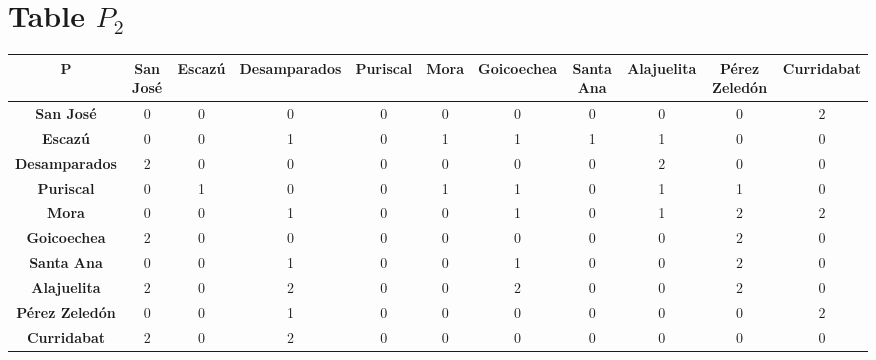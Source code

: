 \documentclass{article}
\begin{document}
\section{Table $P_{2}$}
\begin{center}
    \begin{tabular}{|c||c|c|c|c|c|c|c|c|c|c|}
        \hline
        \textbf{P} & \textbf{San José} & \textbf{Escazú} & \textbf{Desamparados} & \textbf{Puriscal} & \textbf{Mora} & \textbf{Goicoechea} & \textbf{Santa Ana} & \textbf{Alajuelita} & \textbf{Pérez Zeledón} & \textbf{Curridabat} \\
        \hline
        \hline
        \textbf{San José}& 0 & 0 & 0 & 0 & 0 & 0 & 0 & 0 & 0 & \cellcolor[HTML]{D74894}$2$ \\
        \hline
        \textbf{Escazú}& 0 & 0 & 1 & 0 & 1 & 1 & 1 & 1 & 0 & 0 \\
        \hline
        \textbf{Desamparados}& \cellcolor[HTML]{D74894}$2$ & 0 & 0 & 0 & 0 & 0 & 0 & \cellcolor[HTML]{D74894}$2$ & 0 & 0 \\
        \hline
        \textbf{Puriscal}& 0 & 1 & 0 & 0 & 1 & 1 & 0 & 1 & 1 & 0 \\
        \hline
        \textbf{Mora}& 0 & 0 & 1 & 0 & 0 & 1 & 0 & 1 & \cellcolor[HTML]{D74894}$2$ & \cellcolor[HTML]{D74894}$2$ \\
        \hline
        \textbf{Goicoechea}& \cellcolor[HTML]{D74894}$2$ & 0 & 0 & 0 & 0 & 0 & 0 & 0 & \cellcolor[HTML]{D74894}$2$ & 0 \\
        \hline
        \textbf{Santa Ana}& 0 & 0 & 1 & 0 & 0 & 1 & 0 & 0 & \cellcolor[HTML]{D74894}$2$ & 0 \\
        \hline
        \textbf{Alajuelita}& \cellcolor[HTML]{D74894}$2$ & 0 & \cellcolor[HTML]{D74894}$2$ & 0 & 0 & \cellcolor[HTML]{D74894}$2$ & 0 & 0 & \cellcolor[HTML]{D74894}$2$ & 0 \\
        \hline
        \textbf{Pérez Zeledón}& 0 & 0 & 1 & 0 & 0 & 0 & 0 & 0 & 0 & \cellcolor[HTML]{D74894}$2$ \\
        \hline
        \textbf{Curridabat}& \cellcolor[HTML]{D74894}$2$ & 0 & \cellcolor[HTML]{D74894}$2$ & 0 & 0 & 0 & 0 & 0 & 0 & 0 \\
        \hline
    \end{tabular}
\end{center}
\end{document}
